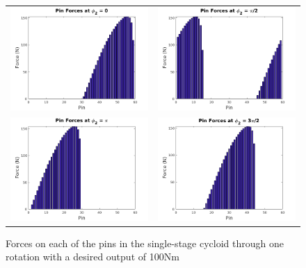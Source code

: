 \begin{figure}[!b]
   \centering
   \begin{tabular}{cc}
	   \includegraphics[width=0.48\linewidth]{fig/single_force_0} &
	   \includegraphics[width=0.48\linewidth]{fig/single_force_pi_2} \\
	   \includegraphics[width=0.48\linewidth]{fig/single_force_pi} &
	   \includegraphics[width=0.48\linewidth]{fig/single_force_3pi2}
   \end{tabular}
   \caption{Forces on each of the pins in the single-stage cycloid through one rotation with a desired output of 100Nm}
   \label{fig:single_forces}
\end{figure}

